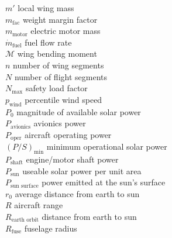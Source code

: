 \begin{tabbing}
$m'$ \> local wing mass \\ %
$m_{\text{fac}}$ \> weight margin factor \\
$m_{\text{motor}}$ \> electric motor mass \\
$\dot{m}_{\text{fuel}}$ \> fuel flow rate \\ %
$\mathcal{M}$ \> wing bending moment \\ %
$n$ \> number of wing segments \\
$N$ \> number of flight segments \\
$N_{\text{max}}$ \> safety load factor\\
$p_{\text{wind}}$ \> percentile wind speed \\
$P_{0}$ \> magnitude of available solar power \\ %
$P_{\text{avionics}}$ \> avionics power \\ %
$P_{\text{oper}}$ \> aircraft operating power \\ %
$(P/S)_{\text{min}}$ \> minimum operational solar power \\ %
$P_{\text{shaft}}$ \> engine/motor shaft power \\ %
$P_{\text{sun}}$ \> useable solar power per unit area \\ %
$P_{\text{sun surface}}$ \> power emitted at the sun's surface \\ %
$r_0$ \> average distance from earth to sun \\
$R$ \> aircraft range \\ %
$R_{\text{earth orbit}}$ \> distance from earth to sun \\
$R_{\text{fuse}}$ \> fuselage radius \\ %

\end{tabbing}
